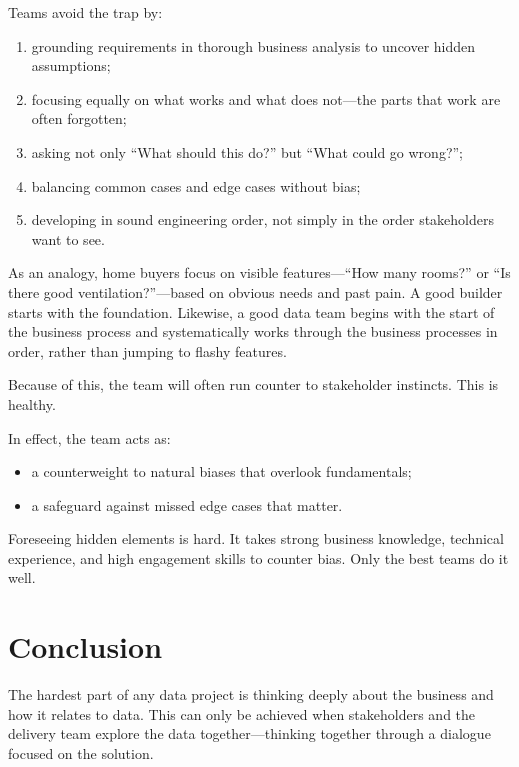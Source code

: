 \documentclass[10pt,openany,10pt]{book}
\providecommand{\tightlist}{%
  \setlength{\itemsep}{0pt}\setlength{\parskip}{0pt}}
\begin{document}
Teams avoid the trap by:

\begin{enumerate}
\def\labelenumi{\arabic{enumi}.}
\tightlist
\item
  grounding requirements in thorough business analysis to uncover hidden
  assumptions;
\item
  focusing equally on what works and what does not---the parts that work
  are often forgotten;
\item
  asking not only ``What should this do?'' but ``What could go wrong?'';
\item
  balancing common cases and edge cases without bias;
\item
  developing in sound engineering order, not simply in the order
  stakeholders want to see.
\end{enumerate}

As an analogy, home buyers focus on visible features---``How many
rooms?'' or ``Is there good ventilation?''---based on obvious needs and
past pain. A good builder starts with the foundation. Likewise, a good
data team begins with the start of the business process and
systematically works through the business processes in order, rather
than jumping to flashy features.

Because of this, the team will often run counter to stakeholder
instincts. This is healthy.

In effect, the team acts as:

\begin{itemize}
\tightlist
\item
  a counterweight to natural biases that overlook fundamentals;
\item
  a safeguard against missed edge cases that matter.
\end{itemize}

Foreseeing hidden elements is hard. It takes strong business knowledge,
technical experience, and high engagement skills to counter bias. Only
the best teams do it well.

\section{Conclusion}\label{conclusion-6}

The hardest part of any data project is thinking deeply about the
business and how it relates to data. This can only be achieved when
stakeholders and the delivery team explore the data together---thinking
together through a dialogue focused on the solution.
\end{document}
